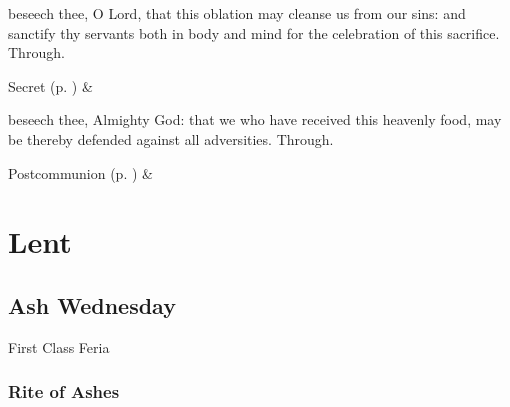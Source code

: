 
\secret
{} beseech thee, O Lord, that this oblation may cleanse us from our sins: and sanctify thy servants both in body and mind for the celebration of this sacrifice. Through.
\begin{rubric}
     Secret  (p. \pageref{SPSaints}) \&  
\end{rubric}


\postcommunion
{} beseech thee, Almighty God: that we who have received this heavenly food, may be thereby defended against all adversities. Through.


\begin{rubric}
     Postcommunion  (p. \pageref{SPSaints}) \&  
\end{rubric}


\clearpage

\section{Lent}

\subsection{Ash Wednesday}
\begin{inhead}
{First Class Feria}
\end{inhead}

\vspace{-0.5\baselineskip}

\subsubsection{Rite of Ashes}

\vspace{-0.25\baselineskip}

